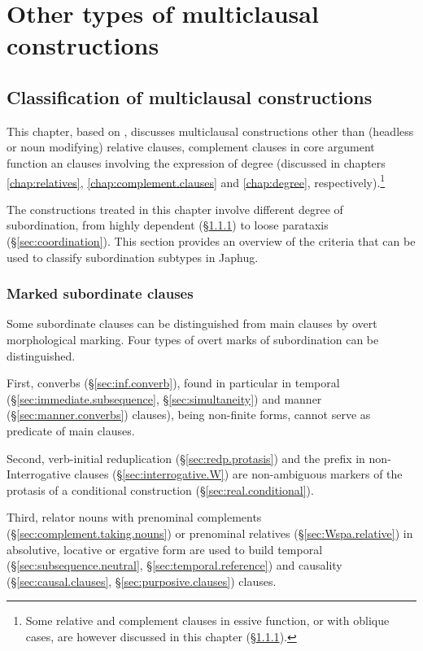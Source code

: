 \chapter{Other types of multiclausal constructions} \label{chap:temporal.conditional}


\section{Classification of multiclausal constructions }
This chapter, based on \citet{jacques14linking}, discusses multiclausal constructions other than (headless or noun modifying) relative clauses, complement clauses in core argument function an clauses involving the expression of degree (discussed in chapters \ref{chap:relatives}, \ref{chap:complement.clauses} and \ref{chap:degree}, respectively).\footnote{Some relative and complement clauses in essive function, or with oblique cases, are however discussed in this chapter (§\ref{sec:marked.subordinate}). } 

The constructions treated in this chapter involve different degree of subordination, from highly dependent (§\ref{sec:marked.subordinate}) to loose parataxis (§\ref{sec:coordination}). This section provides an overview of the criteria that can be used to classify subordination subtypes in Japhug.

\subsection{Marked subordinate clauses}  \label{sec:marked.subordinate}
Some subordinate clauses can be distinguished from main clauses by overt morphological marking. Four types of overt marks of subordination can be distinguished.

First, converbs (§\ref{sec:inf.converb}), found in particular in temporal (§\ref{sec:immediate.subsequence}, §\ref{sec:simultaneity}) and manner (§\ref{sec:manner.converbs}) clauses), being non-finite forms, cannot serve as predicate of main clauses. 

Second, verb-initial reduplication (§\ref{sec:redp.protasis}) and the prefix  in non-Interrogative clauses (§\ref{sec:interrogative.W}) are non-ambiguous markers of the protasis of a conditional construction (§\ref{sec:real.conditional}).

Third, relator nouns with prenominal complements (§\ref{sec:complement.taking.nouns}) or prenominal relatives (§\ref{sec:Wspa.relative}) in absolutive, locative or ergative form are used to build temporal (§\ref{sec:subsequence.neutral}, §\ref{sec:temporal.reference}) and causality (§\ref{sec:causal.clauses}, §\ref{sec:purposive.clauses}) clauses.

